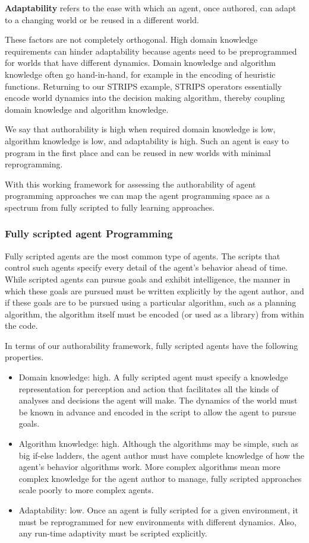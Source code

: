 {\bf Adaptability} refers to the ease with which an agent, once authored, can adapt to a changing world or be reused in a different world.

These factors are not completely orthogonal.  High domain knowledge requirements can hinder adaptability because agents need to be preprogrammed for worlds that have different dynamics.  Domain knowledge and algorithm knowledge often go hand-in-hand, for example in the encoding of heuristic functions.  Returning to our STRIPS example, STRIPS operators essentially encode world dynamics into the decision making algorithm, thereby coupling domain knowledge and algorithm knowledge.

We say that authorability is high when required domain knowledge is low, algorithm knowledge is low, and adaptability is high.  Such an agent is easy to program in the first place and can be reused in new worlds with minimal reprogramming.

With this working framework for assessing the authorability of agent programming approaches we can map the agent programming space as a spectrum from fully scripted to fully learning approaches.

\subsubsection{Fully scripted agent Programming}

Fully scripted agents are the most common type of agents.  The scripts that control such agents specify every detail of the agent's behavior ahead of time.  While scripted agents can pursue goals and exhibit intelligence, the manner in which these goals are pursued must be written explicitly by the agent author, and if these goals are to be pursued using a particular algorithm, such as a planning algorithm, the algorithm itself must be encoded (or used as a library) from within the code.

In terms of our authorability framework, fully scripted agents have the following properties.

\begin{itemize}
\item Domain knowledge: high. A fully scripted agent must specify a knowledge representation for perception and action that facilitates all the kinds of analyses and decisions the agent will make.  The dynamics of the world must be known in advance and encoded in the script to allow the agent to pursue goals.
\item Algorithm knowledge: high.  Although the algorithms may be simple, such as big if-else ladders, the agent author must have complete knowledge of how the agent's behavior algorithms work.  More complex algorithms mean more complex knowledge for the agent author to manage, fully scripted approaches scale poorly to more complex agents.
\item Adaptability: low.  Once an agent is fully scripted for a given environment, it must be reprogrammed for new environments with different dynamics.  Also, any run-time adaptivity must be scripted explicitly.
\end{itemize}

